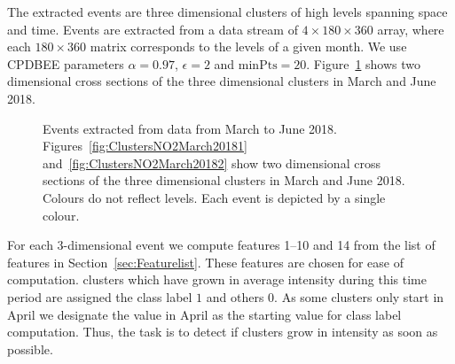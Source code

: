 \documentclass[a4paper,11pt]{article}
\begin{document}
The extracted events are three dimensional clusters of high  levels spanning space and time. Events are extracted from a  data stream of $4 \times 180 \times 360$ array, where each $180 \times 360$ matrix corresponds to the  levels of a given month. We use CPDBEE parameters  $\alpha = 0.97$, $\epsilon=2$ and $\text{minPts} = 20$.
Figure~\ref{fig:ClustersNO2March2018} shows two dimensional cross sections of the three dimensional   clusters in March and June 2018.

\begin{figure}[!hb]
	\centering
	\caption{Events extracted from  data from March to June 2018. Figures~\ref{fig:ClustersNO2March20181} and~\ref{fig:ClustersNO2March20182} show  two dimensional cross sections of the three dimensional  clusters in March and June 2018. Colours do not reflect  levels. Each event is depicted by a single colour.}
	\label{fig:ClustersNO2March2018}
\end{figure}

For each 3-dimensional event we compute features 1--10 and 14 from the list of features in Section~\ref{sec:Featurelist}. These features are chosen for ease of computation.  clusters which have grown in average intensity during this time period  are assigned the class label $1$ and others  $0$. As some  clusters only start in April we designate the value in April as the starting value for class label computation. Thus, the task is to detect if  clusters grow in intensity as soon as possible.
\end{document}
